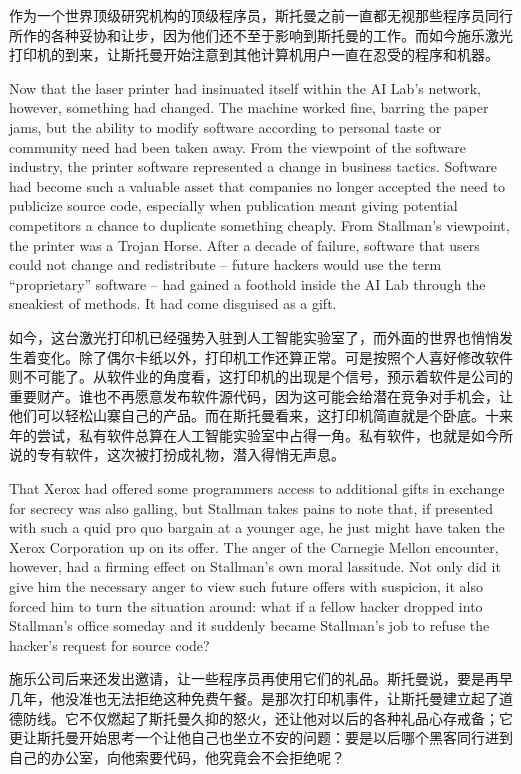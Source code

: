 \ifdefined\chs
作为一个世界顶级研究机构的顶级程序员，斯托曼之前一直都无视那些程序员同行所作的各种妥协和让步，因为他们还不至于影响到斯托曼的工作。而如今施乐激光打印机的到来，让斯托曼开始注意到其他计算机用户一直在忍受的程序和机器。
\fi

\ifdefined\eng
Now that the laser printer had insinuated itself within the AI Lab's network, however, something had changed. The machine worked fine, barring the paper jams, but the ability to modify software according to personal taste or community need had been taken away. From the viewpoint of the software industry, the printer software represented a change in business tactics. Software had become such a valuable asset that companies no longer accepted the need to publicize source code, especially when publication meant giving potential competitors a chance to duplicate something cheaply. From Stallman's viewpoint, the printer was a Trojan Horse. After a decade of failure, software that users could not change and redistribute -- future hackers would use the term ``proprietary'' software -- had gained a foothold inside the AI Lab through the sneakiest of methods. It had come disguised as a gift.
\fi

\ifdefined\chs
如今，这台激光打印机已经强势入驻到人工智能实验室了，而外面的世界也悄悄发生着变化。除了偶尔卡纸以外，打印机工作还算正常。可是按照个人喜好修改软件则不可能了。从软件业的角度看，这打印机的出现是个信号，预示着软件是公司的重要财产。谁也不再愿意发布软件源代码，因为这可能会给潜在竞争对手机会，让他们可以轻松山寨自己的产品。而在斯托曼看来，这打印机简直就是个卧底。十来年的尝试，私有软件总算在人工智能实验室中占得一角。私有软件，也就是如今所说的专有软件，这次被打扮成礼物，潜入得悄无声息。
\fi

\ifdefined\eng
That Xerox had offered some programmers access to additional gifts in exchange for secrecy was also galling, but Stallman takes pains to note that, if presented with such a quid pro quo bargain at a younger age, he just might have taken the Xerox Corporation up on its offer. The anger of the Carnegie Mellon encounter, however, had a firming effect on Stallman's own moral lassitude. Not only did it give him the necessary anger to view such future offers with suspicion, it also forced him to turn the situation around: what if a fellow hacker dropped into Stallman's office someday and it suddenly became Stallman's job to refuse the hacker's request for source code?
\fi

\ifdefined\chs
施乐公司后来还发出邀请，让一些程序员再使用它们的礼品。斯托曼说，要是再早几年，他没准也无法拒绝这种免费午餐。是那次打印机事件，让斯托曼建立起了道德防线。它不仅燃起了斯托曼久抑的怒火，还让他对以后的各种礼品心存戒备；它更让斯托曼开始思考一个让他自己也坐立不安的问题：要是以后哪个黑客同行进到自己的办公室，向他索要代码，他究竟会不会拒绝呢？
\fi

